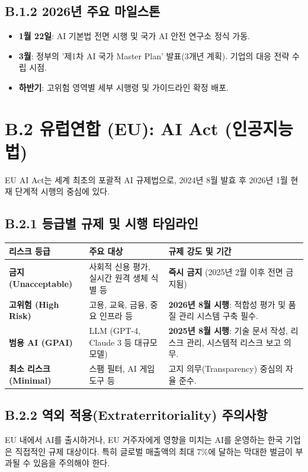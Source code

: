 \subsection*{B.1.2 2026년 주요 마일스톤}
\begin{itemize}
    \item \textbf{1월 22일}: AI 기본법 전면 시행 및 국가 AI 안전 연구소 정식 가동.
    \item \textbf{3월}: 정부의 '제1차 AI 국가 Master Plan' 발표(3개년 계획). 기업의 대응 전략 수립 시점.
    \item \textbf{하반기}: 고위험 영역별 세부 시행령 및 가이드라인 확정 배포.
\end{itemize}

\section*{B.2 유럽연합 (EU): AI Act (인공지능법)}

EU AI Act는 세계 최초의 포괄적 AI 규제법으로, 2024년 8월 발효 후 2026년 1월 현재 단계적 시행의 중심에 있다.

\subsection*{B.2.1 등급별 규제 및 시행 타임라인}

\begin{table}[htbp]
\centering
\begin{tabularx}{\textwidth}{lXX}
\toprule
\textbf{리스크 등급} & \textbf{주요 대상} & \textbf{규제 강도 및 기간} \\
\midrule
\textbf{금지 (Unacceptable)} & 사회적 신용 평가, 실시간 원격 생체 식별 등 & \textbf{즉시 금지} (2025년 2월 이후 전면 금지됨) \\
\midrule
\textbf{고위험 (High Risk)} & 고용, 교육, 금융, 중요 인프라 등 & \textbf{2026년 8월 시행}: 적합성 평가 및 품질 관리 시스템 구축 필수. \\
\midrule
\textbf{범용 AI (GPAI)} & LLM (GPT-4, Claude 3 등 대규모 모델) & \textbf{2025년 8월 시행}: 기술 문서 작성, 리스크 관리, 시스템적 리스크 보고 의무. \\
\midrule
\textbf{최소 리스크 (Minimal)} & 스팸 필터, AI 게임 도구 등 & 고지 의무(Transparency) 중심의 자율 준수. \\
\bottomrule
\end{tabularx}
\end{table}

\subsection*{B.2.2 역외 적용(Extraterritoriality) 주의사항}
EU 내에서 AI를 출시하거나, EU 거주자에게 영향을 미치는 AI를 운영하는 한국 기업은 직접적인 규제 대상이다. 특히 글로벌 매출액의 최대 7\%에 달하는 막대한 벌금이 부과될 수 있음을 주의해야 한다.

